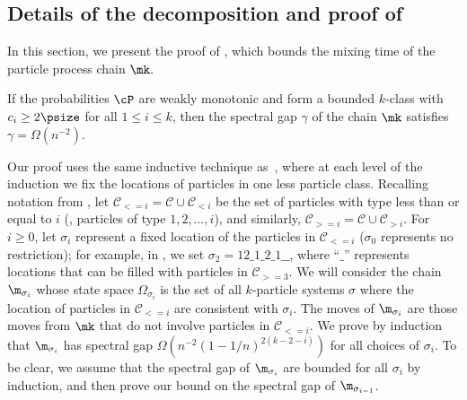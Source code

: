 \documentclass{toc}
\begin{document}
%
%
\subsection{Details of the decomposition and proof of }
\label{sec:mk}

In this section, we present the proof of , which bounds 
the mixing time of the particle process chain $\mk.$  

\begin{thm:mk}
If the probabilities $\cP$ are weakly monotonic and form a bounded 
$k$-class with  $c_i\geq 2\psize$ for all $1\leq i \leq k$, 
then the spectral gap $\gamma$ of the chain $\mk$ satisfies
\abovedisplayskip=3pt
\belowdisplayskip=3pt
$\gamma =\Omega(n^{-2}).$
\end{thm:mk}


Our proof uses the same inductive technique
as~\cite{MS}, where at each level of the induction we fix the
locations of particles in one less particle class.  
Recalling notation from , 
let $\mathcal{C}_{<= i} = \mathcal{C} \cup \mathcal{C}_{< i}$ 
be the set of particles with type less than or 
equal to $i$ (\ie,  particles of type $1, 2, \ldots, i$), and similarly,
$\mathcal{C}_{>= i} = \mathcal{C} \cup \mathcal{C}_{> i}$.  For $i\geq 0$, 
let $\sigma_i$ represent a fixed location of 
the particles in $\mathcal{C}_{<= i}$ ($\sigma_0$ represents 
no restriction); for example, in , we set 
$\sigma_{2} = 12\_1\_2\_1\_\_$, where ``$\_$'' represents  
locations that can be filled with particles in $\mathcal{C}_{>= 3}$. 
We will consider the chain $\m_{\sigma_{i}}$ whose state space 
$\Omega_{\sigma_i}$ is the set of all $k$-particle systems  $\sigma$ 
where the location of particles in $\mathcal{C}_{<= i}$ 
 are consistent with $\sigma_i$. 
The moves of $\m_{\sigma_{i}}$ are those moves from $\mk$ that 
do not involve particles in $\mathcal{C}_{<= i}$.
We prove by induction that 
$\m_{\sigma_{i}}$ has spectral gap $\Omega(n^{-2}(1-1/n)^{2(k-2-i)})$ 
for all choices of $\sigma_i$. To be clear, we assume that the spectral gap of
$\m_{\sigma_{i}}$ are bounded for all $\sigma_i$ by induction, and then 
prove our bound on the spectral gap of $\m_{\sigma_{i-1}}$.
\end{document}
